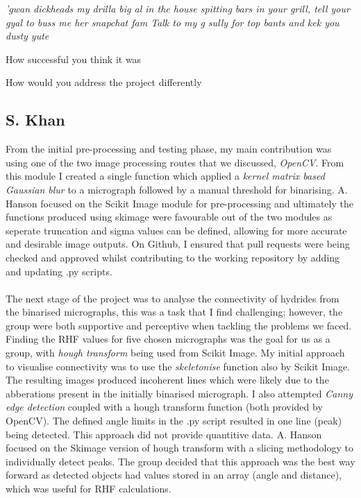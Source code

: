 \documentclass{article}
\begin{document}
\textit{'gwan dickheads my drilla big al in the house spitting bars in your grill, tell your gyal to buss me her snapchat fam
Talk to my g sully for top bants and kek you dusty yute}

How successful you think it was

How would you address the project differently
\subsection{S. Khan}
From the initial pre-processing and testing phase, my main contribution was using one of the two image processing routes that we discussed, \textit{OpenCV}. From this module I created a single function which applied a \textit{kernel matrix based Gaussian blur} to a micrograph followed by a manual threshold for binarising. A. Hanson focused on the Scikit Image module for pre-processing and ultimately the functions produced using skimage were favourable out of the two modules as seperate truncation and sigma values can be defined, allowing for more accurate and desirable image outputs. On Github, I ensured that pull requests were being checked and approved whilst contributing to the working repository by adding and updating .py scripts.
\\ \\
The next stage of the project was to analyse the connectivity of hydrides from the binarised micrographs, this was a task that I find challenging; however, the group were both supportive and perceptive when tackling the problems we faced. Finding the RHF values for five chosen micrographs was the goal for us as a group, with \textit{hough transform} being used from Scikit Image. My initial approach to visualise connectivity was to use the \textit{skeletonise} function also by Scikit Image. The resulting images produced incoherent lines which were likely due to the abberations present in the initially binarised micrograph. I also attempted \textit{Canny edge detection} coupled with a hough transform function (both provided by OpenCV). The defined angle limits in the .py script resulted in one line (peak) being detected. This approach did not provide quantitive data. A. Hanson focused on the Skimage version of hough transform with a slicing methodology to individually detect peaks. The group decided that this approach was the best way forward as detected objects had values stored in an array (angle and distance), which was useful for RHF calculations.
\\ \\
\end{document}
